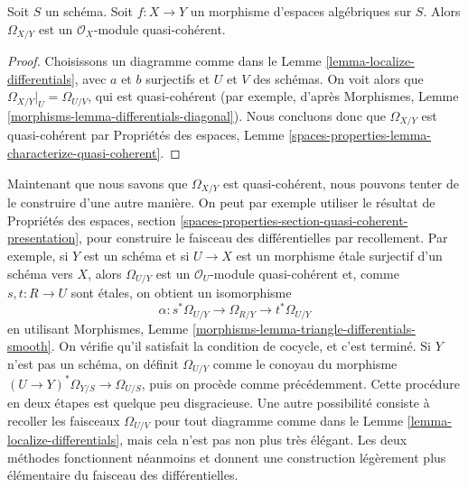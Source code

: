 \begin{lemma}
\label{lemma-module-differentials-quasi-coherent}
Soit $S$ un schéma. Soit $f : X \to Y$ un morphisme d'espaces algébriques
sur $S$. Alors $\Omega_{X/Y}$ est un $\mathcal{O}_X$-module quasi-cohérent.
\end{lemma}

\begin{proof}
Choisissons un diagramme comme dans le
Lemme \ref{lemma-localize-differentials},
avec $a$ et $b$ surjectifs et $U$ et $V$ des schémas.
On voit alors que $\Omega_{X/Y}|_U = \Omega_{U/V}$, qui est
quasi-cohérent (par exemple, d'après
Morphismes, Lemme \ref{morphisms-lemma-differentials-diagonal}).
Nous concluons donc que $\Omega_{X/Y}$ est quasi-cohérent par
Propriétés des espaces,
Lemme \ref{spaces-properties-lemma-characterize-quasi-coherent}.
\end{proof}

\begin{remark}
\label{remark-alternative}
Maintenant que nous savons que $\Omega_{X/Y}$ est quasi-cohérent, nous pouvons tenter
de le construire d'une autre manière. On peut par exemple utiliser le résultat de
Propriétés des espaces,
section \ref{spaces-properties-section-quasi-coherent-presentation},
pour construire le faisceau des différentielles par recollement.
Par exemple, si $Y$ est un schéma et si $U \to X$ est un morphisme étale surjectif
d'un schéma vers $X$, alors $\Omega_{U/Y}$ est
un $\mathcal{O}_U$-module quasi-cohérent et, comme $s, t : R \to U$
sont étales, on obtient un isomorphisme
$$
\alpha : s^*\Omega_{U/Y} \to \Omega_{R/Y} \to t^*\Omega_{U/Y}
$$
en utilisant
Morphismes, Lemme \ref{morphisms-lemma-triangle-differentials-smooth}.
On vérifie qu'il satisfait la condition de cocycle, et c'est terminé.
Si $Y$ n'est pas un schéma, on définit $\Omega_{U/Y}$ comme le conoyau
du morphisme $(U \to Y)^*\Omega_{Y/S} \to \Omega_{U/S}$, puis on procède comme
précédemment. Cette procédure en deux étapes est quelque peu disgracieuse. Une autre possibilité
consiste à recoller les faisceaux $\Omega_{U/V}$ pour tout diagramme comme dans le
Lemme \ref{lemma-localize-differentials},
mais cela n'est pas non plus très élégant. Les deux méthodes fonctionnent néanmoins et
donnent une construction légèrement plus élémentaire du faisceau des
différentielles.
\end{remark}

